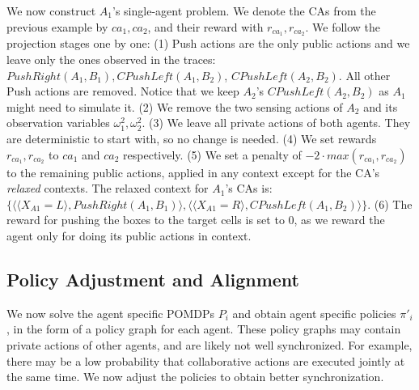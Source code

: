 \documentclass[runningheads]{llncs}
\newcommand{\PushRight}{\mathit{PushRight}}
\newcommand{\CPushLeft}{\mathit{CPushLeft}}
\begin{document}
\begin{example}
We now construct $A_1$'s single-agent problem. We denote the CAs from the previous example by $ca_1, ca_2$, and their reward with $r_{ca_1}, r_{ca_2}$. We follow the projection stages one by one: 
(1) Push actions are the only public actions and we leave only the ones observed
in the traces: $ \PushRight(A_1,B_1), \CPushLeft(A_1,B_2)$, $\CPushLeft(A_2,B_2)$.
All other Push actions are removed.
Notice that we keep $A_2$'s $\CPushLeft(A_2,B_2)$ as $A_1$ might need to simulate it. 
(2) We remove the two sensing actions of  $A_2$ and its observation variables $\omega^2_1,\omega^2_2$.
(3) We leave all private actions of both agents. They are deterministic to start with, so no change is needed.
(4) We set rewards $r_{ca_1}, r_{ca_2}$ to  $ca_1$ and $ca_2$ respectively.
(5) We set a penalty of $-2\cdot max(r_{ca_1}, r_{ca_2})$ to the remaining public actions, applied in any context except for the CA's {\em relaxed} contexts. 
The relaxed context for $A_1$'s CAs is:
$\{  \langle \langle X_{A1}=L\rangle,\PushRight(A_1,B_1)\rangle,
\langle\langle X_{A1}=R \rangle,\CPushLeft(A_1,B_2)\rangle\}$.
(6) The reward for pushing the boxes to the target cells is set to 0, as we reward the agent only for doing its public actions in context.
\end{example}




\subsection{Policy Adjustment and Alignment}
We now solve the agent specific POMDPs $P_i$ and obtain agent specific policies $\pi'_i$, in the form of a policy graph for each agent.
These policy graphs may contain private actions of other agents,
and are likely not well synchronized. For example, there may be a low probability that collaborative actions are executed jointly at the same time. We now adjust the policies to obtain better synchronization.
\end{document}
